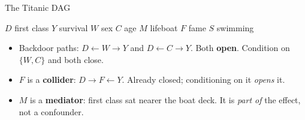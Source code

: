 \documentclass[
  11pt,
  ignorenonframetext,
  aspectratio=169,
]{beamer}
\providecommand{\tightlist}{%
  \setlength{\itemsep}{0pt}\setlength{\parskip}{0pt}}
\begin{document}
\begin{frame}{The Titanic DAG}
\protect{}\label{the-titanic-dag}
\begin{center}
\end{center}

\vspace{-0.3em}

\footnotesize

\(D\) first class \quad \(Y\) survival \quad \(W\) sex \quad \(C\) age
\quad \(M\) lifeboat \quad \(F\) fame \quad \(S\) swimming

\normalsize

\begin{itemize}
\tightlist
\item
  Backdoor paths: \(D \leftarrow W \rightarrow Y\) and
  \(D \leftarrow C \rightarrow Y\). Both \textbf{open}. Condition on
  \(\{W,C\}\) and both close.
\item
  \(F\) is a \textbf{collider}: \(D \rightarrow F \leftarrow Y\).
  Already closed; conditioning on it \emph{opens} it.
\item
  \(M\) is a \textbf{mediator}: first class sat nearer the boat deck. It
  is \emph{part of} the effect, not a confounder.
\end{itemize}
\end{frame}
\end{document}
